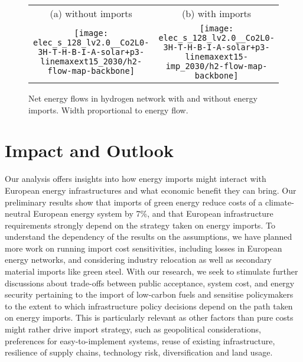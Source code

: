 \documentclass[10pt,5p,reversenotenum,lefttitle]{elsarticle}
\renewcommand{\ttdefault}{\sfdefault}
\begin{document}
\begin{figure*}
    \centering\small
    \begin{tabular}{cc}
        (a) without imports & (b) with imports \\
        \texttt{[image: elec\_s\_128\_lv2.0\_\_Co2L0-3H-T-H-B-I-A-solar+p3-linemaxext15\_2030/h2-flow-map-backbone]}
        &
        \texttt{[image: elec\_s\_128\_lv2.0\_\_Co2L0-3H-T-H-B-I-A-solar+p3-linemaxext15-imp\_2030/h2-flow-map-backbone]}
    \end{tabular}
    \caption{Net energy flows in hydrogen network with and without energy imports. Width proportional to energy flow.}
    \label{fig:hydrogen-flows}
\end{figure*}



\section*{Impact and Outlook}

Our analysis offers insights into how energy imports might interact with
European energy infrastructures and what economic benefit they can bring. Our
preliminary results show that imports of green energy reduce costs of a
climate-neutral European energy system by 7\%, and that European infrastructure
requirements strongly depend on the strategy taken on energy imports. To
understand the dependency of the results on the assumptions, we have planned
more work on running import cost sensitivities, including losses in European
energy networks, and considering industry relocation as well as secondary
material imports like green steel. With our research, we seek to stimulate
further discussions about trade-offs between public acceptance, system cost, and
energy security pertaining to the import of low-carbon fuels and sensitise
policymakers to the extent to which infrastructure policy decisions depend on
the path taken on energy imports. This is particularly relevant as other factors
than pure costs might rather drive import strategy, such as geopolitical
considerations, preferences for easy-to-implement systems, reuse of existing
infrastructure, resilience of supply chains, technology risk, diversification
and land usage.

\renewcommand{\ttdefault}{\sfdefault}

\end{document}
